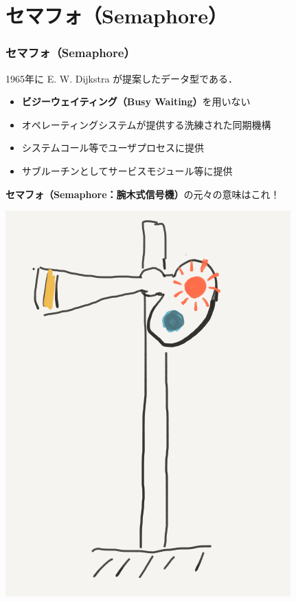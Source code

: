 \documentclass[dvipdfmx]{beamer}
\begin{document}
\section{セマフォ（Semaphore）}
\begin{frame}
  \frametitle{セマフォ（Semaphore）}
  1965年に E. W. Dijkstra が提案したデータ型である．
  \begin{itemize}
  \item {\bf ビジーウェイティング（Busy Waiting）}を用いない
  \item オペレーティングシステムが提供する洗練された同期機構
  \item システムコール等でユーザプロセスに提供
  \item サブルーチンとしてサービスモジュール等に提供
  \end{itemize}

{\bf セマフォ（Semaphore：腕木式信号機）}の元々の意味はこれ！

\begin{center}
\includegraphics[scale=0.4]{Fig/semaphore.png}
\end{center}
\end{frame}
\end{document}
